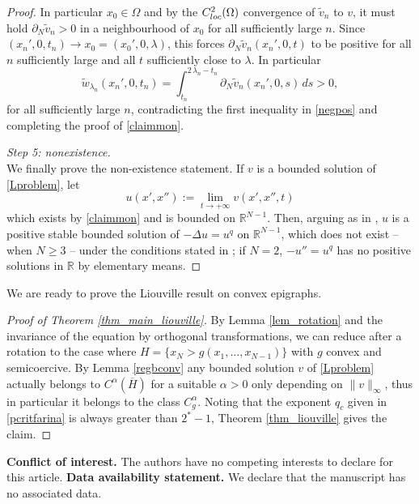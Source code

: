 \documentclass[12pt]{amsart}
\numberwithin{equation}{section}
\theoremstyle{plain}
\theoremstyle{plain}
\theoremstyle{plain}
\theoremstyle{definition}
\newcommand{\R}{{\mathbb R}}
\begin{document}
\begin{proof}
In particular $x_0\in \Omega$ and by the $C^2_{\rm loc}(\Omega)$ convergence of $\tilde{v}_n$ to $v$, it must hold $\partial_N \tilde{v}_n>0$ in a neighbourhood of $x_0$ for all sufficiently large $n$. 
Since $(x_n', 0, t_n)\to x_0=(x_0', 0, \lambda)$, this forces $\partial_N \tilde{v}_{n}(x_n', 0, t)$ to be positive for all $n$ sufficiently large and all $t$ sufficiently close to $\lambda$. 
In particular
\[
\tilde{w}_{\lambda_n}(x_n',0, t_n)=\int_{t_n}^{2\, 
\lambda_n-t_n}\partial_N 
\tilde{v}_n(x_n', 0, s)\, ds>0,
\]
for all sufficiently large $n$, contradicting the first inequality in \eqref{negpos} and completing the proof of \eqref{claimmon}.

\smallskip
{\em Step 5: nonexistence.} \\
We finally prove the non-existence statement. If $v$ is a bounded solution of \eqref{Lproblem}, let 
\[
u(x', x''):=\lim_{t\to +\infty} v(x', x'', t)
\]
which exists by \eqref{claimmon} and is bounded on $\R^{N-1}$. 
Then, arguing as in \cite[proof of Theorem 12]{Far07}, $u$ is a positive stable bounded solution of $-\Delta u=u^q$ on $\R^{N-1}$, which does not exist -- when $N\geq 3$ -- under the conditions stated in 
\cite[Theorem 1]{Far07}; 
if $N=2$, $-u''=u^q$ has no positive solutions in $\R$ by elementary means.
\end{proof}

We are ready to prove the Liouville result on convex epigraphs.

\begin{proof}[Proof of Theorem \ref{thm_main_liouville}]
By Lemma \ref{lem_rotation} and the invariance of the equation by orthogonal transformations, we can reduce after a rotation to the case where $H=\{x_N>g(x_1, \dots, x_{N-1})\} $ with $g$ convex and semicoercive. By Lemma \ref{regbconv} any bounded solution $v$ of \eqref{Lproblem} actually belongs to $C^\alpha(\overline{H})$ for a suitable $\alpha>0$ only depending on $\|v\|_\infty$, thus in particular it belongs to the class $C^\alpha_g$. Noting that the exponent $q_c$ given in \eqref{pcritfarina} is always greater than $2^*-1$, Theorem \ref{thm_liouville} gives the claim.
 \end{proof}
 
\vskip3mm
\noindent\textbf{Conflict of interest.} The authors have no competing interests to declare for this article.
\vskip3mm
\noindent\textbf{Data availability statement.} We declare that the manuscript has no associated data.
\vskip3mm
\end{document}
